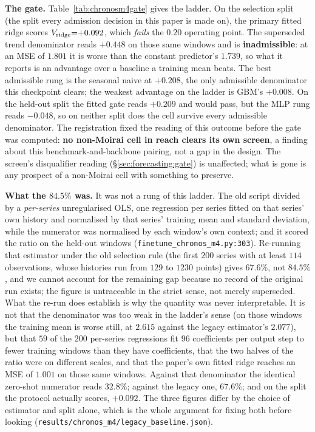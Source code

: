 \textbf{The gate.}
Table~\ref{tab:chronosm4gate} gives the ladder.  On the selection split (the
split every admission decision in this paper is made on), the primary fitted
ridge scores $V_{\text{ridge}}{=}{+}0.092$, which \emph{fails} the $0.20$
operating point.  The superseded trend denominator reads $+0.448$ on those same
windows and is \textbf{inadmissible}: at an MSE of $1.801$ it is worse than the
constant predictor's $1.739$, so what it reports is an advantage over a baseline
a training mean beats.  The best admissible rung is the seasonal naive at
$+0.208$, the only admissible denominator this checkpoint clears; the weakest
advantage on the ladder is GBM's $+0.008$.  On the held-out split the fitted gate
reads $+0.209$ and would pass, but the MLP rung reads $-0.048$, so on neither
split does the cell survive every admissible denominator.  The registration fixed
the reading of this outcome before the gate was computed: \textbf{no non-Moirai
cell in reach clears its own screen}, a finding about this
benchmark-and-backbone pairing, not a gap in the design.  The screen's
disqualifier reading (\S\ref{sec:forecasting:gate}) is unaffected; what is gone
is any prospect of a non-Moirai cell with something to preserve.

\textbf{What the $84.5\%$ was.}  It was not a rung of this ladder.  The old
script divided by a \emph{per-series} unregularised OLS, one regression per series
fitted on that series' own history and normalised by that series' training mean
and standard deviation, while the numerator was normalised by each window's own
context; and it scored the ratio on the held-out windows
(\texttt{finetune\_chronos\_m4.py:303}).  Re-running that estimator under the old
selection rule (the first $200$ series with at least $114$ observations, whose
histories run from $129$ to $1230$ points) gives $67.6\%$, not $84.5\%$, and
we cannot account for the remaining gap because no record of the original run
exists; the figure is untraceable in the strict sense, not merely superseded.
What the re-run does establish is why the quantity was never interpretable.  It is
not that the denominator was too weak in the ladder's sense (on those windows
the training mean is worse still, at $2.615$ against the legacy estimator's
$2.077$), but that $59$ of the $200$ per-series regressions fit $96$
coefficients per output step to fewer training windows than they have
coefficients, that the two halves of the ratio were on different scales, and that
the paper's own fitted ridge reaches an MSE of $1.001$ on those same windows.
Against that denominator the identical zero-shot numerator reads $32.8\%$; against
the legacy one, $67.6\%$; and on the split the protocol actually scores, $+0.092$.
The three figures differ by the choice of estimator and split alone, which is the
whole argument for fixing both before looking
(\texttt{results/chronos\_m4/legacy\_baseline.json}).

